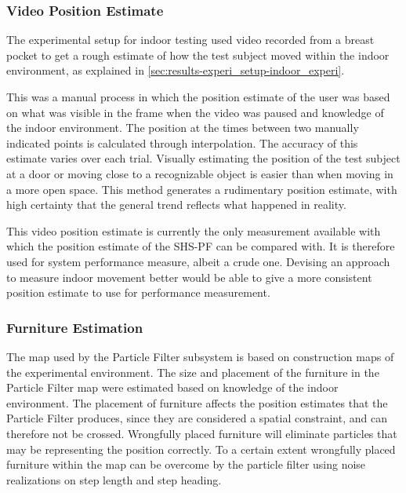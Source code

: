 \subsubsection{Video Position Estimate}
The experimental setup for indoor testing used video recorded from a breast pocket to get a rough estimate of how the test subject moved within the indoor environment, as explained in \cref{sec:results-experi_setup-indoor_experi}. \par 

This was a manual process in which the position estimate of the user was based on what was visible in the frame when the video was paused and knowledge of the indoor environment. The position at the times between two manually indicated points is calculated through interpolation. The accuracy of this estimate varies over each trial. Visually estimating the position of the test subject at a door or moving close to a recognizable object is easier than when moving in a more open space. This method generates a rudimentary position estimate, with high certainty that the general trend reflects what happened in reality.  \par 

This video position estimate is currently the only measurement available with which the position estimate of the SHS-PF can be compared with. It is therefore used for system performance measure, albeit a crude one. Devising an approach to measure indoor movement better would be able to give a more consistent position estimate to use for performance measurement. \par 



\subsubsection{Furniture Estimation}
The map used by the Particle Filter subsystem is based on construction maps of the experimental environment. The size and placement of the furniture in the Particle Filter map were estimated based on knowledge of the indoor environment. The placement of furniture affects the position estimates that the Particle Filter produces, since they are considered a spatial constraint, and can therefore not be crossed. Wrongfully placed furniture will eliminate particles that may be representing the position correctly. To a certain extent wrongfully placed furniture within the map can be overcome by the particle filter using noise realizations on step length and step heading. \par 

